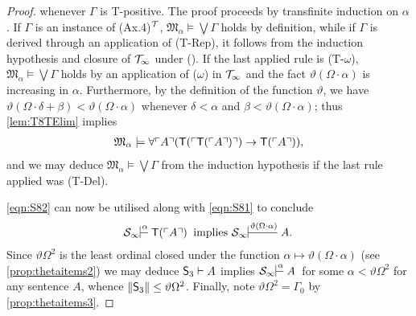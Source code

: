 \documentclass[UKenglish,cleveref,DIV=12]{scrartcl}
\theoremstyle{definition}
\theoremstyle{definition}
\begin{document}
\begin{proof}
whenever $\Gamma$ is T-positive. The
proof proceeds by transfinite induction on $\alpha$. If $\Gamma$ is an instance
of (Ax.4)$^{\mathcal{T}}$, $\mathfrak{M}_\alpha\models\bigvee\Gamma$ holds by definition,
while if $\Gamma$ is derived through an application of (T-Rep), it follows from
the induction hypothesis and closure of $\mathcal{T}_\infty$ under (). If the last applied rule is (T-$\omega$), $\mathfrak{M}_\alpha\models\bigvee\Gamma$ holds by an application of
($\omega$) in $\mathcal{T}_\infty$ and the fact $\vartheta(\Omega\cdot\alpha)$ is increasing in $\alpha$.
Furthermore, by the definition of the function $\vartheta$, we have
$\vartheta(\Omega\cdot\delta+\beta)<\vartheta(\Omega\cdot\alpha)$ whenever
$\delta<\alpha$ and $\beta<\vartheta(\Omega\cdot\alpha)$; thus
\cref{lem:T8TElim} implies
\begin{align*}
  \mathfrak{M}_\alpha\models\forall\ulcorner{A}\urcorner(\mathsf{T}(\ulcorner{\mathsf{T}(\ulcorner{A}\urcorner)}\urcorner)\rightarrow \mathsf{T}(\ulcorner{A}\urcorner)),
\end{align*}
and we may deduce $\mathfrak{M}_\alpha\models\bigvee\Gamma$ from the induction
hypothesis if the last rule applied was (T-Del).

\eqref{eqn:S82} can now be utilised along with \eqref{eqn:S81} to conclude
\begin{align*}%
 \theoryinf S\prov\alpha{}{\T(\gn A)}\text{ implies }\theoryinf
S\prov{\vartheta(\Omega\cdot\alpha)}{} {A.}
\end{align*}
Since $\vartheta\Omega^2$ is the least ordinal closed under the function
$\alpha\mapsto\vartheta(\Omega\cdot\alpha)$ (see \cref{prop:thetaitems2}) we
may deduce $\mathsf{S}_3\vdash A$ implies $\theoryinf S\prov\alpha{}A$ for
some $\alpha<\vartheta\Omega^2$ for any sentence $A$, whence $\lVert{\mathsf{S}_3}\rVert\le\vartheta\Omega^2$. Finally, note $\vartheta\Omega^2=\Gamma_0$
by \cref{prop:thetaitems3}.
\end{proof}
\end{document}
